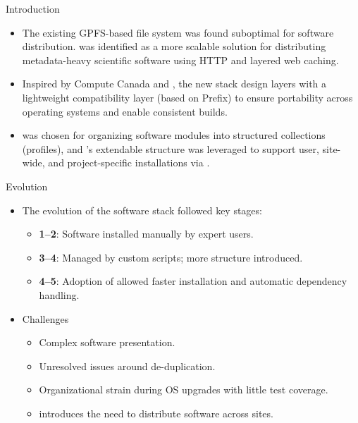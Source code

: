 \documentclass[final]{beamer}
\begin{document}
\begin{frame}[t]
\begin{columns}[t]
\begin{column}{0.48\textwidth}
\begin{block}{Introduction}
\begin{itemize}
          \item The existing GPFS-based file system was found suboptimal
          for software distribution. \cvmfs{} was identified as a more
          scalable solution for distributing metadata-heavy scientific
          software using HTTP and layered web caching.

          \item Inspired by Compute Canada and \eessi{}, the new stack design
              layers \cvmfs{} with a lightweight compatibility layer (based on
                \gentoo{} Prefix) to ensure portability across operating systems and enable consistent builds.

          \item \lmod{} was chosen for organizing software modules into
          structured collections (profiles), and \eessi{}'s extendable
          structure was leveraged to support user, site-wide, and
          project-specific installations via \easybuild{}.
        \end{itemize}
    \end{block}

    \begin{block}{Evolution}
     \begin{itemize}
      \item The evolution of the software stack followed key stages:
      \begin{itemize}
        \item \vsc{} \textbf{1–2}: Software installed manually by expert users.
        \item \vsc{} \textbf{3–4}: Managed by custom scripts; more structure introduced.
        \item \vsc{} \textbf{4–5}: Adoption of \spack{} allowed faster installation and automatic dependency handling.
      \end{itemize}
      \item Challenges
      \begin{itemize}
        \item Complex software presentation.
        \item Unresolved issues around de-duplication.
        \item Organizational strain during OS upgrades with little test coverage.
        \item \musica{} introduces the need to distribute software across sites.
      \end{itemize}
     \end{itemize}
    \end{block}
    \vfill


\end{column}
\end{columns}
\end{frame}
\end{document}

